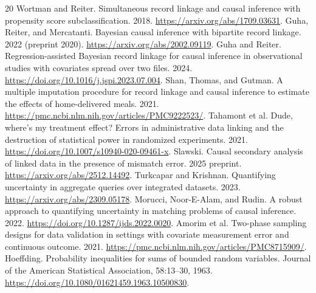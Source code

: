 \documentclass[11pt]{article}
\begin{document}
\begingroup\small
\begin{thebibliography}{20}
 Wortman and Reiter. Simultaneous record linkage and causal inference
with propensity score subclassification. 2018.
\url{https://arxiv.org/abs/1709.03631}.
 Guha, Reiter, and Mercatanti. Bayesian causal inference with bipartite
record linkage. 2022 (preprint 2020). \url{https://arxiv.org/abs/2002.09119}.
 Guha and Reiter. Regression-assisted Bayesian record linkage for causal
inference in observational studies with covariates spread over two files. 2024.
\url{https://doi.org/10.1016/j.jspi.2023.07.004}.
 Shan, Thomas, and Gutman. A multiple imputation procedure for record
linkage and causal inference to estimate the effects of home-delivered meals. 2021.
\url{https://pmc.ncbi.nlm.nih.gov/articles/PMC9222523/}.
 Tahamont et al. Dude, where's my treatment effect? Errors in
administrative data linking and the destruction of statistical power in randomized
experiments. 2021. \url{https://doi.org/10.1007/s10940-020-09461-x}.
 Slawski. Causal secondary analysis of linked data in the presence of
mismatch error. 2025 preprint. \url{https://arxiv.org/abs/2512.14492}.
 Turkcapar and Krishnan. Quantifying uncertainty in aggregate queries
over integrated datasets. 2023. \url{https://arxiv.org/abs/2309.05178}.
 Morucci, Noor-E-Alam, and Rudin. A robust approach to quantifying
uncertainty in matching problems of causal inference. 2022.
\url{https://doi.org/10.1287/ijds.2022.0020}.
 Amorim et al. Two-phase sampling designs for data validation in
settings with covariate measurement error and continuous outcome. 2021.
\url{https://pmc.ncbi.nlm.nih.gov/articles/PMC8715909/}.
 Hoeffding. Probability inequalities for sums of bounded random
variables. Journal of the American Statistical Association, 58:13--30, 1963.
\url{https://doi.org/10.1080/01621459.1963.10500830}.
\end{thebibliography}
\endgroup
\end{document}
